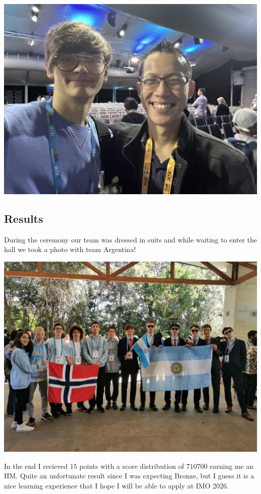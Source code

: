 \documentclass{article}
\begin{document}
\begin{center}
  \includegraphics[scale=0.07]{assets/eddie-woo.jpg}
\end{center}

\subsection{Results}

During the ceremony our team was dressed in suits and while waiting to enter the hall we took a photo with team Argentina!

\begin{center}
  \includegraphics[scale=0.2]{assets/teams.jpg}
\end{center}

In the end I recieved \(15\) points with a score distribution of \(710700\) earning me an HM. Quite an unfortunate result since I was expecting Bronze, but I guess it is a nice learning experience that I hope I will be able to apply at IMO 2026.
\end{document}
